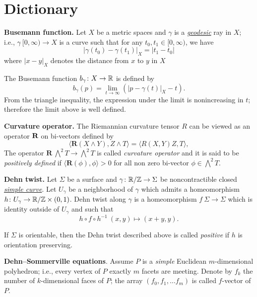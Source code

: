 \chapter{Dictionary}

\begin{description}

\item{\bf Busemann function.}\label{Busemann function} Let $X$ be a metric spaces
and $\gamma$ is a \hyperref[Geodesic]{\emph{geodesic}} ray in $X$; 
i.e., $\gamma\:[0, \infty)\to X$ is a curve such that for any $t_0,t_1\in[0,\infty)$, we have  
$$|\gamma(t_0)-\gamma(t_1)|_X=|t_1-t_0|$$
where $|x-y|_X$ denotes the distance from $x$ to $y$ in $X$

The Busemann function $b_\gamma\colon X\to\mathbb{R}$ is defined by
$$b_\gamma(p)=\lim_{t\to\infty}\left(|p-\gamma(t)|_X-t\right).$$
From the triangle inequality, 
the expression under the limit is nonincreasing in $t$; 
therefore  the limit above is well defined.

\item{\bf Curvature operator.}\label{Curvature operator}
The Riemannian curvature tensor $R$
can be viewed as an operator $\text{\bf R}$ on bi-vectors
defined by
$$\langle\mathbf{R}(X\wedge Y),Z\wedge T\rangle
=
\langle R(X,Y)Z,T\rangle,$$
The operator $\mathbf{R}\:\bigwedge^2 T\to \bigwedge^2 T$ is called \emph{curvature operator} and it is said to be \emph{positively defined} if
$\langle\mathbf{R}(\phi),\phi\rangle>0$ for all non zero
bi-vector $\phi\in\bigwedge^2 T$.

\item{\bf Dehn twist.}\label{Dehn twist}
Let $\Sigma$ be a surface and $\gamma\colon\mathbb{R}/\mathbb{Z}\to\Sigma$ be noncontractible closed \hyperref[Simple curve]{\emph{simple curve}}.
Let $U_\gamma$ be a neighborhood of $\gamma$ which admits a homeomorphism $h\colon U_\gamma\to \mathbb{R}/\mathbb{Z}\times (0,1)$.
Dehn twist along $\gamma$ is a homeomorphism $f\:\Sigma\to\Sigma$
which is identity outside of $U_\gamma$ and 
such that
$$h\circ f\circ h^{-1}\:(x,y)\mapsto(x+y,y).$$

If $\Sigma$ is orientable, then the Dehn twist described above is called \emph{positive} if $h$ is orientation preserving.

\item{\bf Dehn--Sommerville equations}\label{Dehn--Sommerville equations}.
Assume $P$ is a \emph{simple} Euclidean $m$-dimensional polyhedron;
i.e., every vertex of $P$ exactly $m$ facets are meeting.
Denote by $f_k$ the number of $k$-dimensional faces of $P$;
the array $(f_0,f_1,\dots f_m)$ is called $f$-vector of $P$.


\end{description}
